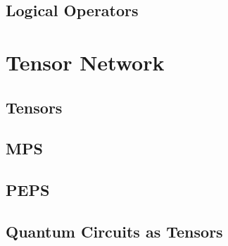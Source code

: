 \subsection{Logical Operators}




\section{Tensor Network}
\subsection{Tensors}

\subsection{MPS}

\subsection{PEPS}


\subsection{Quantum Circuits as Tensors}